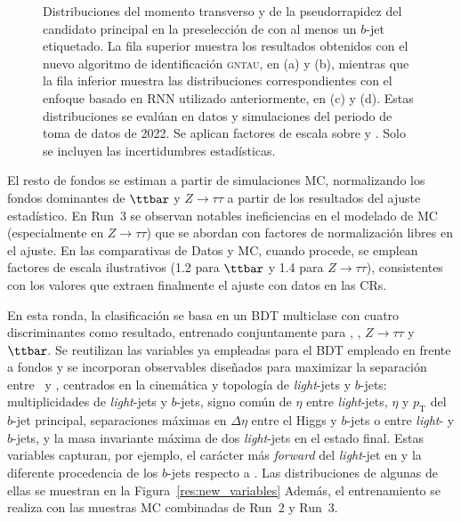 \begin{figure}[htbp]
  \caption{Distribuciones del momento transverso y de la pseudorrapidez del candidato \tauhad principal en la preselección de \ttH con al menos un $b$-jet etiquetado. La fila superior muestra los resultados obtenidos con el nuevo algoritmo de identificación \textsc{gntau}, en (a) y (b), mientras que la fila inferior muestra las distribuciones correspondientes con el enfoque basado en RNN utilizado anteriormente, en (c) y (d). Estas distribuciones se evalúan en datos y simulaciones del periodo de toma de datos de 2022. Se aplican factores de escala sobre \ztautau y \ttbar. Solo se incluyen las incertidumbres estadísticas.
  }
  \label{res:fakes_new}
\end{figure}
El resto de fondos se estiman a partir de simulaciones MC, normalizando los fondos dominantes de $\ttbar$ y $Z\to\tau\tau$ a partir de los resultados del ajuste estadístico. 
En Run~3 se observan notables ineficiencias en el modelado de MC (especialmente en $Z\to\tau\tau$) que se abordan con factores de normalización libres en el ajuste. En las comparativas de Datos y MC, cuando procede, se emplean factores de escala ilustrativos (1.2 para $\ttbar$ y 1.4 para $Z\to\tau\tau$), consistentes con los valores que extraen finalmente el ajuste con datos en las CRs. 

En esta ronda, la clasificación se basa en un BDT multiclase con cuatro discriminantes como resultado, entrenado conjuntamente para \ttH, \thqb, $Z\to\tau\tau$ y $\ttbar$. Se reutilizan las variables ya empleadas para el BDT empleado en \ttH frente a fondos y se incorporan observables diseñados para maximizar la separación entre \ttH\ y \thqb, centrados en la cinemática y topología de \emph{light}-jets y $b$-jets: multiplicidades de \emph{light}-jets y $b$-jets, signo común de $\eta$ entre \emph{light}-jets, $\eta$ y $p_{\mathrm{T}}$ del $b$-jet principal, separaciones máximas en $\Delta\eta$ entre el Higgs y $b$-jets o entre \emph{light}- y $b$-jets, y la masa invariante máxima de dos \emph{light}-jets en el estado final. Estas variables capturan, por ejemplo, el carácter más \textit{forward} del \textit{light}-jet en \thqb y la diferente procedencia de los $b$-jets respecto a \ttH. Las distribuciones de algunas de ellas se muestran en la Figura~\ref{res:new_variables}
Además, el entrenamiento se realiza con las muestras MC combinadas de Run~2 y Run~3.

